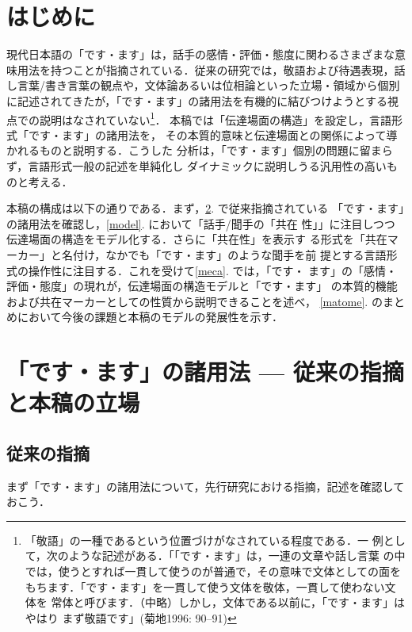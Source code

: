 \documentclass[japanese]{jnlp_1.3c}
\begin{document}
\maketitle


\section{はじめに}

現代日本語の「です・ます」は，話手の感情・評価・態度に関わるさまざまな意
味用法を持つことが指摘されている．従来の研究では，敬語および待遇表現，話
し言葉/書き言葉の観点や，文体論あるいは位相論といった立場・領域から個別
に記述されてきたが，「です・ます」の諸用法を有機的に結びつけようとする視
点での説明はなされていない\footnote{
	「敬語」の一種であるという位置づけがなされている程度である．一
	例として，次のような記述がある．「「です・ます」は，一連の文章や話し言葉
	の中では，使うとすれば一貫して使うのが普通で，その意味で文体としての面を
	もちます．「です・ます」を一貫して使う文体を敬体，一貫して使わない文体を
	常体と呼びます．（中略）しかし，文体である以前に，「です・ます」はやはり
	まず敬語です」(菊地1996: 90--91)}．
本稿では「伝達場面の構造」を設定し，言語形式「です・ます」の諸用法を，
その本質的意味と伝達場面との関係によって導かれるものと説明する．こうした
分析は，「です・ます」個別の問題に留まらず，言語形式一般の記述を単純化し
ダイナミックに説明しうる汎用性の高いものと考える．

本稿の構成は以下の通りである．まず，\ref{youhou}. で従来指摘されている
「です・ます」の諸用法を確認し，\ref{model}. において「話手/聞手の「共在
性」」に注目しつつ伝達場面の構造をモデル化する．さらに「共在性」を表示す
る形式を「共在マーカー」と名付け，なかでも「です・ます」のような聞手を前
提とする言語形式の操作性に注目する．これを受けて\ref{meca}. では，「です・
ます」の「感情・評価・態度」の現れが，伝達場面の構造モデルと「です・ます」
の本質的機能および共在マーカーとしての性質から説明できることを述べ，
\ref{matome}. のまとめにおいて今後の課題と本稿のモデルの発展性を示す．

\section{「です・ます」の諸用法 --- 従来の指摘と本稿の立場}\label{youhou}

\subsection{従来の指摘}

まず「です・ます」の諸用法について，先行研究における指摘，記述を確認して
おこう．
\end{document}
